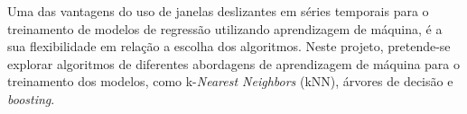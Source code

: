 Uma das vantagens do uso de janelas deslizantes em séries temporais para o treinamento de modelos de regressão utilizando aprendizagem de máquina, é a sua flexibilidade em relação a escolha dos algoritmos. Neste projeto, pretende-se explorar algoritmos de diferentes abordagens de aprendizagem de máquina para o treinamento dos modelos, como k-\textit{Nearest Neighbors} (kNN), árvores de decisão e  \textit{boosting}.







